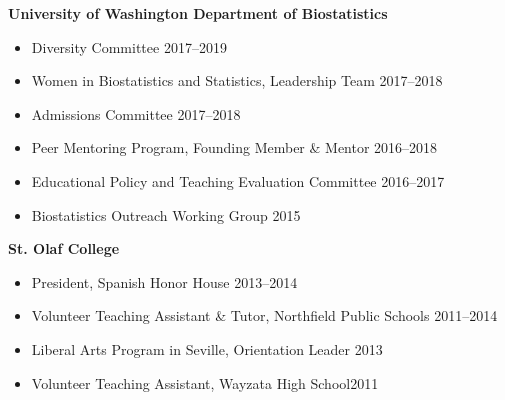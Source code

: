 \documentclass[margin]{res}
\begin{document}
\begin{resume}
\textbf{University of Washington Department of Biostatistics}
\begin{itemize} %
	
	\item Diversity Committee \hfill 2017--2019
	
	\item Women in Biostatistics and Statistics, Leadership Team \hfill 2017--2018
	
	\item Admissions Committee \hfill 2017--2018
	
	\item Peer Mentoring Program, Founding Member \& Mentor \hfill 2016--2018
	
	\item Educational Policy and Teaching Evaluation Committee \hfill 2016--2017
	
	\item Biostatistics Outreach Working Group \hfill 2015%
\end{itemize}



\textbf{St. Olaf College}
\begin{itemize}
			
			\item President, Spanish Honor House \hfill 2013--2014
			
			\item Volunteer Teaching Assistant \& Tutor, Northfield Public Schools \hfill 2011--2014
			
			
			
			\item Liberal Arts Program in Seville, Orientation Leader \hfill 2013 
			
			
			
			\item Volunteer Teaching Assistant, Wayzata High School\hfill 2011 \\
\end{itemize}





\end{resume}
\end{document}
